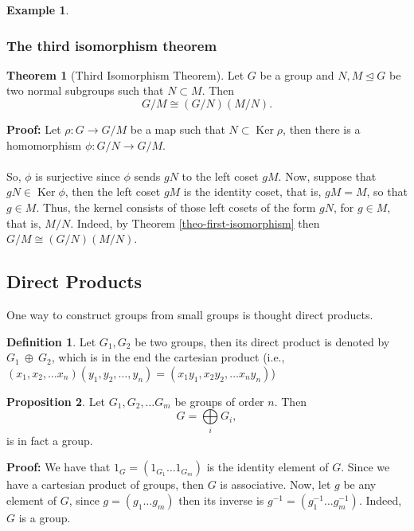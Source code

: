 \documentclass[11pt]{amsbook}%
\theoremstyle{plain}
\theoremstyle{definition}
\newtheorem{definition*}{Definition}
\newtheorem*{example*}{Example}
\newtheorem{proposition}[theorem]{Proposition}
\newtheorem{theorem}{Theorem}
\numberwithin{equation}{section}
\DeclareMathOperator{\Ker}{Ker}
\newcommand{\leftnormal}{\trianglelefteq}
\begin{document}
\begin{example*}
\subsubsection{The third isomorphism theorem}
\begin{theorem}[Third Isomorphism Theorem]
  \label{theo-thrid-isomorphism}
  Let $G$ be a group and $N, M \leftnormal G$
  be two normal subgroups such that $N \subset M$. Then
  $$
  G/M \cong (G/N)(M/N).
  $$
\end{theorem} \vspace{1.8em}
\textbf{Proof: }Let $\rho: G \longrightarrow G/M$ be a map such that
$N \subset \Ker \rho$, then there is a homomorphism $\phi: G/N \longrightarrow G/M$. \\ \\
So, $\phi$ is surjective since $\phi$ sends $gN$ to the left coset $gM$.
Now, suppose that $gN \in \Ker \phi$, then the left coset $gM$ is the identity coset,
that is, $gM = M$, so that $g \in M$. Thus, the kernel consists of those left
cosets of the form $gN$, for $g \in M$, that is, $M/N$. Indeed, by Theorem \ref{theo-first-isomorphism} then
$G/M \cong (G/N)(M/N)$. \qedsymbol


\subsection{Direct Products}
One way to construct groups from small groups is thought direct products.

\begin{definition*}
  \label{def-direct-product}
  Let $G_{1}, G_{2}$ be two groups, then its direct product is denoted by
  $G_{1} \ \oplus \ G_{2}$, which is in the end the cartesian product
  (i.e., $(x_{1}, x_{2}, \dots x_{n})(y_{1}, y_{2}, \dots, y_{n}) = (x_{1}y_{1}, x_{2}y_{2}, \dots x_{n}y_{n})$)
\end{definition*}

\begin{proposition}
  Let $G_{1}, G_{2}, \dots G_{m}$ be groups of order $n$. Then
  $$
  G = \bigoplus\limits_{i} G_{i},
  $$
  is in fact a group.
\end{proposition} \vspace{1.8em}
\textbf{Proof: }We have that $1_{G} = (1_{G_{1}} \dots 1_{G_{m}})$ is the identity
element of $G$. Since we have a cartesian product of groups, then
$G$ is associative. Now, let $g$ be any element of $G$, since
$g = (g_{1} \dots g_{m})$ then its inverse is $g^{-1} = (g_{1}^{-1} \dots g_{m}^{-1})$.
Indeed, $G$ is a group. \qedsymbol


\end{example*}
\end{document}
